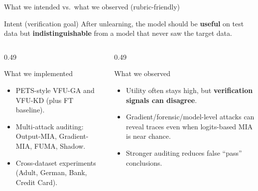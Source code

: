 \documentclass[aspectratio=169, 11pt]{beamer}
\begin{document}
\begin{frame}{What we intended vs.\ what we observed (rubric-friendly)}
  \begin{block}{Intent (verification goal)}
    After unlearning, the model should be \textbf{useful} on test data but \textbf{indistinguishable} from a model that never saw the target data.
  \end{block}
  \vspace{0.35em}
  \begin{columns}[T]
    \begin{column}{0.49\textwidth}
      \begin{exampleblock}{What we implemented}
        \begin{itemize}
          \item PETS-style \textsc{VFU-GA} and \textsc{VFU-KD} (plus FT baseline).
          \item Multi-attack auditing: Output-MIA, Gradient-MIA, FUMA, Shadow.
          \item Cross-dataset experiments (Adult, German, Bank, Credit Card).
        \end{itemize}
      \end{exampleblock}
    \end{column}
    \begin{column}{0.49\textwidth}
      \begin{alertblock}{What we observed}
        \begin{itemize}
          \item Utility often stays high, but \textbf{verification signals can disagree}.
          \item Gradient/forensic/model-level attacks can reveal traces even when logits-based MIA is near chance.
          \item Stronger auditing reduces false ``pass'' conclusions.
        \end{itemize}
      \end{alertblock}
    \end{column}
  \end{columns}
\end{frame}
\end{document}
